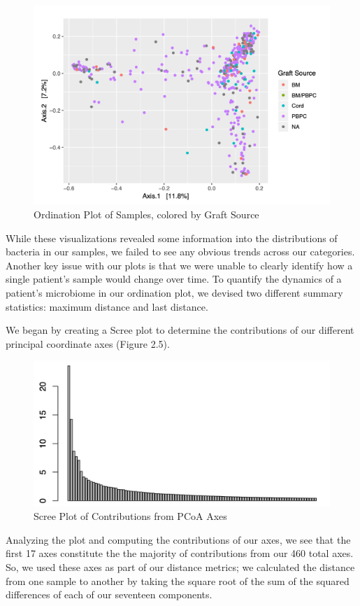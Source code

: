 \documentclass[12pt,twoside]{dukestatscithesis}
\begin{document}
\begin{figure}
\includegraphics[width=700px]{figure/figure6} \caption{Ordination Plot of Samples, colored by Graft Source}\label{fig:figure6}
\end{figure}
While these visualizations revealed some information into the
distributions of bacteria in our samples, we failed to see any obvious
trends across our categories. Another key issue with our plots is that
we were unable to clearly identify how a single patient's sample would
change over time. To quantify the dynamics of a patient's microbiome in
our ordination plot, we devised two different summary statistics:
maximum distance and last distance.

We began by creating a Scree plot to determine the contributions of our
different principal coordinate axes (Figure 2.5).
\begin{figure}
\includegraphics[width=700px]{figure/figure7} \caption{Scree Plot of Contributions from PCoA Axes}\label{fig:figure7}
\end{figure}
Analyzing the plot and computing the contributions of our axes, we see
that the first 17 axes constitute the the majority of contributions from
our 460 total axes. So, we used these axes as part of our distance
metrics; we calculated the distance from one sample to another by taking
the square root of the sum of the squared differences of each of our
seventeen components.
\end{document}
